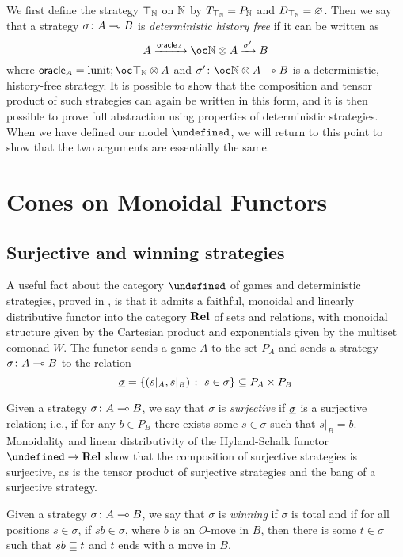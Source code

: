 \documentclass[sigplan,10pt,review]{acmart}\settopmatter{printfolios=true,printccs=false,printacmref=false}
\let\G\undefined
\let\C\undefined
\newcommand{\oracle}{{\textsf{oracle}}}
\begin{document}
We first define the strategy $\top_{\mathbb{N}}$ on $\mathbb{N}$ by $T_{\top_{\mathbb{N}}}=P_{\mathbb{N}}$ and $D_{\top_{\mathbb{N}}}=\varnothing$.  
Then we say that a strategy $\sigma\colon A\multimap B$ is \emph{deterministic history free} if it can be written as
\[
  A \xrightarrow{\oracle_A}
    \oc \bN \tensor A \xrightarrow{\sigma'}
      B
  \]
where $\oracle_A=\lunit;\oc\top_\bN\tensor A$ and $\sigma'\from \oc\bN\tensor A \implies B$ is a deterministic, history-free strategy.
It is possible to show that the composition and tensor product of such strategies can again be written in this form, and it is then possible to prove full abstraction using properties of deterministic strategies.  
When we have defined our model $\C$, we will return to this point to show that the two arguments are essentially the same.

\section{Cones on Monoidal Functors}

\subsection{Surjective and winning strategies}

A useful fact about the category $\G$ of games and deterministic strategies, proved in \cite{hylandSchalkGames}, is that it admits a faithful, monoidal and linearly distributive functor into the category ${\normalfont\textbf{Rel}}$ of sets and relations, with monoidal structure given by the Cartesian product and exponentials given by the multiset comonad $W$.  
The functor sends a game $A$ to the set $P_A$ and sends a strategy $\sigma\colon A\multimap B$ to the relation
\[
  \underline{\sigma}=\{(s\vert_A,s\vert_B)\;\colon\; s\in\sigma\}\subseteq P_A\times P_B
  \]

Given a strategy $\sigma\colon A\multimap B$, we say that $\sigma$ is \emph{surjective} if $\underline{\sigma}$ is a surjective relation; i.e., if for any $b\in P_B$ there exists some $s\in\sigma$ such that $s\vert_B=b$.  
Monoidality and linear distributivity of the Hyland-Schalk functor $\G\to\Rel$ show that the composition of surjective strategies is surjective, as is the tensor product of surjective strategies and the bang of a surjective strategy.  

Given a strategy $\sigma\colon A\multimap B$, we say that $\sigma$ is \emph{winning} if $\sigma$ is total and if for all positions $s\in\sigma$, if $sb\in\sigma$, where $b$ is an $O$-move in $B$, then there is some $t\in\sigma$ such that $sb\sqsubseteq t$ and $t$ ends with a move in $B$.  
\end{document}
